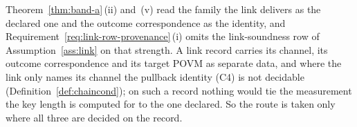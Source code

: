 
Theorem~\ref{thm:band-a}\,(ii) and~(v) read the family the link delivers as the
declared one and the outcome correspondence as the identity, and
Requirement~\ref{req:link-row-provenance}\,(i) omits the link-soundness row of
Assumption~\ref{ass:link} on that strength. A link record carries its
channel, its outcome correspondence and its target POVM as separate data, and
where the link only names its channel the pullback identity (C4) is not
decidable (Definition~\ref{def:chaincond}); on such a record nothing would
tie the measurement the key length is computed for to the one declared. So
the route is taken only where all three are decided on the record.

